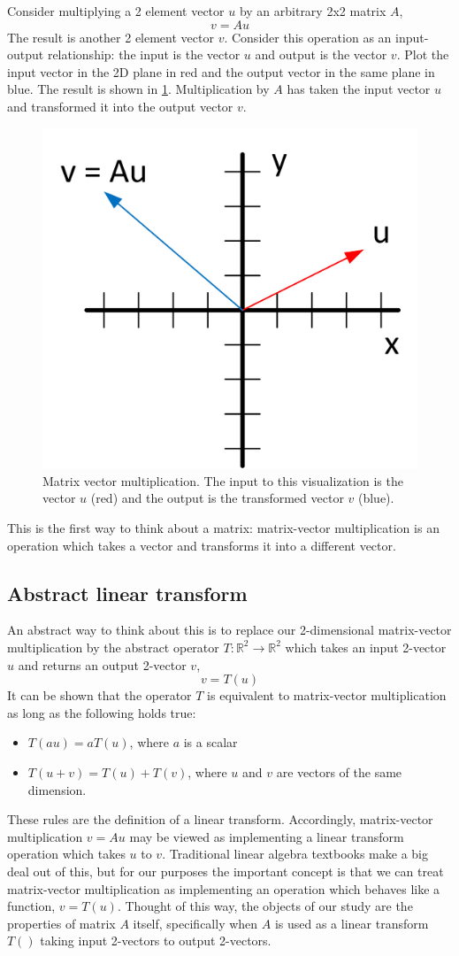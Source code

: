 \documentclass[onefignum,onetabnum]{siamart190516}
\newcommand{\R}{\mathbb{R}}
\begin{document}
Consider multiplying a 2 element vector $u$ by an arbitrary 2x2 matrix $A$,
$$
v = A u
$$
The result is another 2 element vector $v$.  Consider this operation as
an input-output relationship: the input is the vector $u$ and output is
the vector $v$.  Plot the input vector in the 2D plane in red and the
output vector in the same plane in blue.  The result is shown in
\cref{fig:MatrixVectorMultiplication}.  Multiplication by $A$ has taken the input vector $u$ and
transformed it into the output vector $v$.  
\begin{figure}[thb]
	\centering
	\includegraphics[width=0.4\columnwidth]{MatrixVectorMultiplication.png}
	\caption{Matrix vector multiplication.  The input to this visualization
		is the vector $u$ (red) and the output is the transformed vector $v$ (blue).}
	\label{fig:MatrixVectorMultiplication}
\end{figure}
This is the first way to think about a matrix:  matrix-vector
multiplication is an operation 
which takes a vector and transforms it into a different vector.

\subsection{Abstract linear transform}
An abstract way to think about this is to replace our 2-dimensional
matrix-vector multiplication by the abstract operator $T: \R^2 \to \R^2$ which
takes an input 2-vector $u$ and returns an output 2-vector $v$,
$$
v = T(u)
$$
It can be shown that the operator $T$ is equivalent to matrix-vector multiplication 
as long as the following holds true:
\begin{itemize}
	\item $T(a u) = a T(u)$, where $a$ is a scalar
	\item $T(u+v) = T(u)+T(v)$, where $u$ and $v$ are vectors of the same dimension.
\end{itemize}
These rules are the definition of a linear transform.  Accordingly, matrix-vector
multiplication $v = A u$ may be viewed as implementing a linear transform operation which
takes $u$ to $v$.   
Traditional linear algebra textbooks make a big deal out of this, but for our purposes the important
concept is that we can treat matrix-vector multiplication as implementing
an operation which behaves like a function, $v = T(u)$.  Thought of this way, the
objects of our study are the properties of matrix $A$ itself, 
specifically when $A$ is used as a linear transform $T()$
taking input 2-vectors to output 2-vectors.
\end{document}
